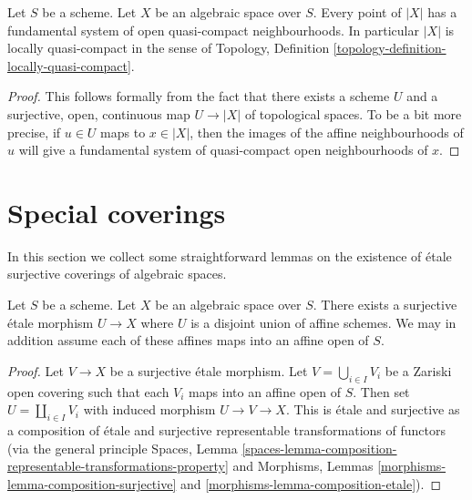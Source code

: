 \begin{lemma}
\label{lemma-space-locally-quasi-compact}
Let $S$ be a scheme.
Let $X$ be an algebraic space over $S$.
Every point of $|X|$ has a fundamental system of open
quasi-compact neighbourhoods.
In particular $|X|$ is locally quasi-compact in the sense of
Topology, Definition \ref{topology-definition-locally-quasi-compact}.
\end{lemma}

\begin{proof}
This follows formally from the fact that there exists a scheme
$U$ and a surjective, open, continuous map
$U \to |X|$ of topological spaces. To be a bit more precise, if
$u \in U$ maps to $x \in |X|$, then the images of the affine
neighbourhoods of $u$ will give a fundamental system of quasi-compact
open neighbourhoods of $x$.
\end{proof}







\section{Special coverings}
\label{section-special-coverings}

\noindent
In this section we collect some straightforward lemmas on the existence
of \'etale surjective coverings of algebraic spaces.

\begin{lemma}
\label{lemma-cover-by-union-affines}
Let $S$ be a scheme.
Let $X$ be an algebraic space over $S$.
There exists a surjective \'etale morphism $U \to X$ where
$U$ is a disjoint union of affine schemes.
We may in addition assume each of these affines
maps into an affine open of $S$.
\end{lemma}

\begin{proof}
Let $V \to X$ be a surjective \'etale morphism.
Let $V = \bigcup_{i \in I} V_i$ be a Zariski open covering
such that each $V_i$ maps into an affine open of $S$.
Then set $U = \coprod_{i \in I} V_i$ with induced morphism
$U \to V \to X$. This is \'etale and surjective as a composition
of \'etale and surjective representable
transformations of functors (via the general principle
Spaces, Lemma
\ref{spaces-lemma-composition-representable-transformations-property}
and
Morphisms, Lemmas \ref{morphisms-lemma-composition-surjective} and
\ref{morphisms-lemma-composition-etale}).
\end{proof}

